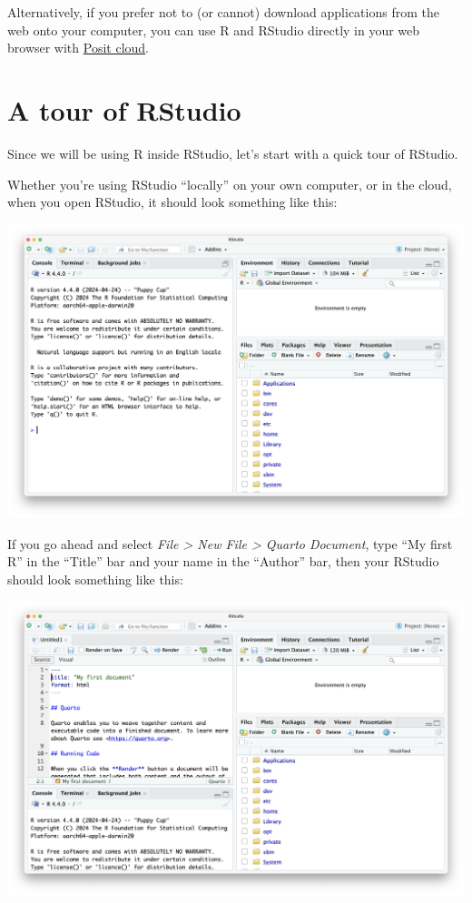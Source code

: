 \documentclass[
  letterpaper,
  DIV=11,
  numbers=noendperiod]{scrreprt}
\begin{document}
Alternatively, if you prefer not to (or cannot) download applications
from the web onto your computer, you can use R and RStudio directly in
your web browser with \href{https://posit.cloud/plans}{Posit cloud}.

\section{A tour of RStudio}\label{a-tour-of-rstudio}

Since we will be using R inside RStudio, let's start with a quick tour
of RStudio.

Whether you're using RStudio ``locally'' on your own computer, or in the
cloud, when you open RStudio, it should look something like this:

\includegraphics[width=10.22in,height=\textheight]{figures/rstudio_initial.png}

If you go ahead and select \emph{File \textgreater{} New File
\textgreater{} Quarto Document}, type ``My first R'' in the ``Title''
bar and your name in the ``Author'' bar, then your RStudio should look
something like this:

\includegraphics[width=10.22in,height=\textheight]{figures/rstudio_first_doc.png}
\end{document}

